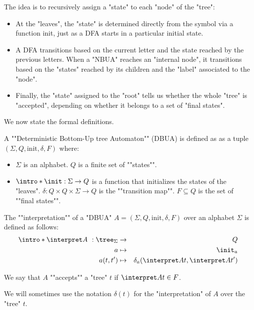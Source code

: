 \documentclass[twoside]{article}
\begin{document}
The idea is to recursively assign a "state" to each "node" of the "tree":
\begin{itemize}
	\item At the "leaves", the "state" is determined directly from the symbol via a function init, just as a DFA starts in a particular initial state.
	\item A DFA transitions based on the current letter and the state reached by the previous letters.
	      When a "NBUA" reaches an "internal node", it transitions based on the "states" reached by its children and the "label" associated to the "node".
	\item Finally, the "state" assigned to the "root" tells us whether the whole "tree" is "accepted",
	      depending on whether it belongs to a set of "final states".
\end{itemize}

We now state the formal definitions.

\begin{definition}
	\AP A ""Deterministic Bottom-Up tree Automaton"" (DBUA) is defined as as a tuple $(\Sigma, Q, \text{init}, \delta, F)$ where:
	\begin{itemize}
		\item $\Sigma$ is an alphabet.
		      \itemAP $Q$ is a finite set of ""states"".
		\item $\intro *\init : \Sigma \to Q$ is a function that initializes the states of the "leaves".
		      \itemAP $\delta : Q \times Q \times \Sigma \to Q$ is the ""transition map"".
		      \itemAP $F \subseteq Q$ is the set of ""final states"".
	\end{itemize}
\end{definition}

\begin{definition}
	\AP The ""interpretation"" of a "DBUA" $A = (\Sigma, Q, \text{init}, \delta, F)$  over an alphabet $\Sigma$ is defined as follows:
	\begin{eqnarray*}
		\intro* \interpret A ~: \tree_{\Sigma} &\to& Q \\
		a &\mapsto& \init_a \\
		a(t,t') &\mapsto& \delta_a (\interpret A t, \interpret A {t'})
	\end{eqnarray*}

	We say that $A$ ""accepts"" a "tree" $t$ if $\interpret A t \in F$.

	We will sometimes use the notation $\delta(t)$ for the "interpretation" of $A$ over the "tree" $t$.
\end{definition}
\end{document}

